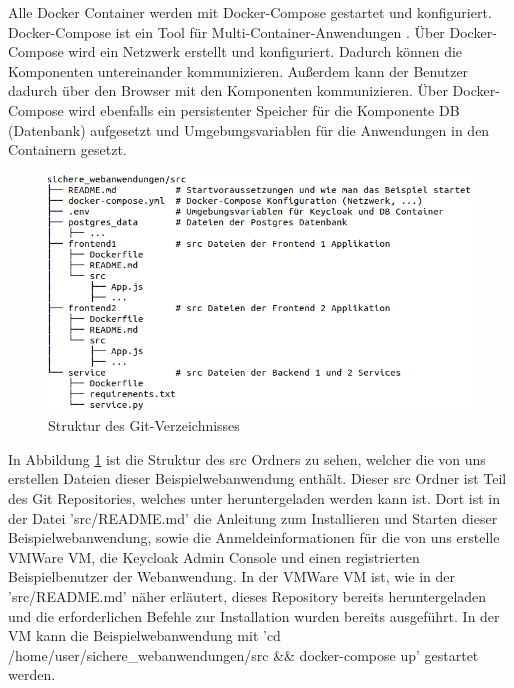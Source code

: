 Alle Docker Container werden mit Docker-Compose gestartet und konfiguriert. Docker-Compose ist ein Tool für Multi-Container-Anwendungen \cite{EB40}. Über Docker-Compose wird ein Netzwerk erstellt und konfiguriert. Dadurch können die Komponenten untereinander kommunizieren. Außerdem kann der Benutzer dadurch über den Browser mit den Komponenten kommunizieren. Über Docker-Compose wird ebenfalls ein persistenter Speicher für die Komponente DB (Datenbank) aufgesetzt und Umgebungsvariablen für die Anwendungen in den Containern gesetzt.

\begin{figure}[!ht]
	\centering
	\includegraphics[width=1\textwidth]{Images/EbertScherer/srcDirectoryStructure.PNG}
	\caption{Struktur des Git-Verzeichnisses}
	\label{fig:EB_Struktur des Git-Verzeichnisses}
\end{figure}

In Abbildung \ref{fig:EB_Struktur des Git-Verzeichnisses} ist die Struktur des src Ordners zu sehen, welcher die von uns erstellen Dateien dieser Beispielwebanwendung enthält. Dieser src Ordner ist Teil des Git Repositories, welches unter \cite{SSEB1} heruntergeladen werden kann ist. Dort ist in der Datei 'src/README.md' \cite{SSEB2} die Anleitung zum Installieren und Starten dieser Beispielwebanwendung, sowie die Anmeldeinformationen für die von uns erstelle VMWare VM, die Keycloak Admin Console und einen registrierten Beispielbenutzer der Webanwendung. In der VMWare VM ist, wie in der 'src/README.md' näher erläutert, dieses Repository bereits heruntergeladen und die erforderlichen Befehle zur Installation wurden bereits ausgeführt. In der VM kann die Beispielwebanwendung mit 'cd /home/user/sichere\_webanwendungen/src \&\& docker-compose up' gestartet werden.

